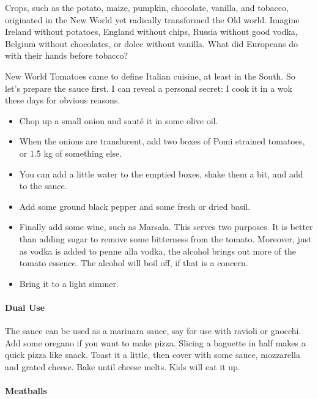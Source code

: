 Crops, such as the potato, maize, pumpkin, chocolate, vanilla, and tobacco, originated in the New World yet radically transformed the Old world. Imagine Ireland without potatoes, England without chips, Russia without good vodka, Belgium without chocolates, or dolce without vanilla. What did Europeans do with their hands before tobacco?

New World Tomatoes came to define Italian cuisine, at least in the South. So let's prepare the sauce first. I can reveal a personal secret: I cook it in a wok these days for obvious reasons.

\begin{itemize}


\item Chop up a small onion and sauté it in some olive oil.

\item When the onions are translucent, add two boxes of Pomi strained tomatoes, or 1.5 kg of something else.

\item You can add a little water to the emptied boxes, shake them a bit, and add to the sauce.

\item Add some ground black pepper and some fresh or dried basil.

\item Finally add some wine, such as Marsala. This serves two purposes. It is better than adding sugar to remove some bitterness from the tomato. Moreover, just as vodka is added to penne alla vodka, the alcohol brings out more of the tomato essence. The alcohol will boil off, if that is a concern.

\item Bring it to a light simmer.
\end{itemize}


\paragraph{Dual Use}


The sauce can be used as a marinara sauce, say for use with ravioli or gnocchi. Add some oregano if you want to make pizza. Slicing a baguette in half makes a quick pizza like snack. Toast it a little, then cover with some sauce, mozzarella and grated cheese. Bake until cheese melts. Kids will eat it up.

\paragraph{Meatballs}


